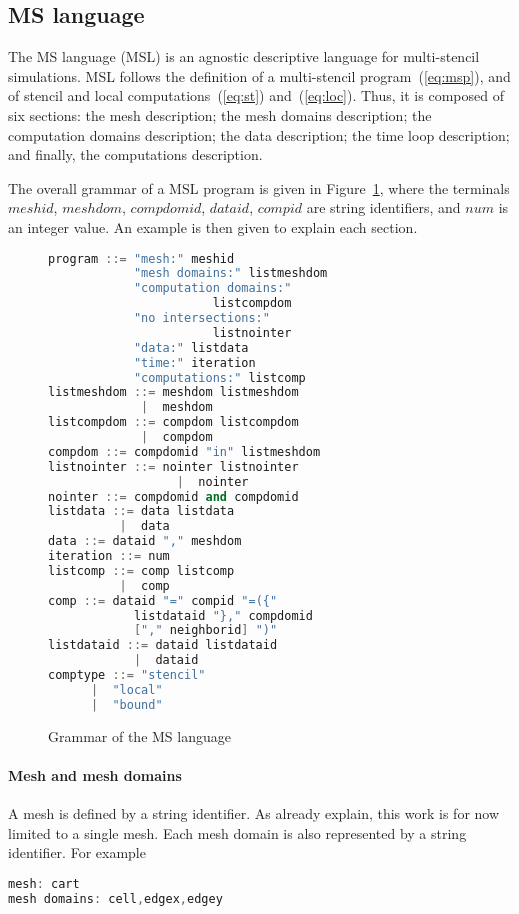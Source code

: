 \subsection{MS language}
The MS language (MSL) is an agnostic descriptive language for multi-stencil simulations. MSL follows the definition of a multi-stencil program~(\ref{eq:msp}), and of stencil and local computations~(\ref{eq:st}) and~(\ref{eq:loc}). Thus, it is composed of six sections: the mesh description; the mesh domains description; the computation domains description; the data description; the time loop description; and finally, the computations description.

The overall grammar of a MSL program is given in Figure~\ref{fig:grammar}, where the terminals $meshid$, $meshdom$, $compdomid$, $dataid$, $compid$ are string identifiers, and $num$ is an integer value. An example is then given to explain each section.

\begin{figure}[h!]
\begin{lstlisting}[basicstyle=\small,mathescape,frame=single,language=C++]
program ::= "mesh:" meshid 
            "mesh domains:" listmeshdom
            "computation domains:" 
                       listcompdom
            "no intersections:"
                       listnointer
            "data:" listdata
            "time:" iteration
            "computations:" listcomp
listmeshdom ::= meshdom listmeshdom
             |  meshdom
listcompdom ::= compdom listcompdom
             |  compdom
compdom ::= compdomid "in" listmeshdom
listnointer ::= nointer listnointer
                  |  nointer
nointer ::= compdomid and compdomid
listdata ::= data listdata
          |  data
data ::= dataid "," meshdom
iteration ::= num
listcomp ::= comp listcomp
          |  comp
comp ::= dataid "=" compid "=({" 
            listdataid "}," compdomid 
            ["," neighborid] ")"
listdataid ::= dataid listdataid
            |  dataid
comptype ::= "stencil"
      |  "local"
      |  "bound"
\end{lstlisting}
\caption{Grammar of the MS language}
\label{fig:grammar}
\end{figure}

\paragraph{Mesh and mesh domains} A mesh is defined by a string identifier. As already explain, this work is for now limited to a single mesh. Each mesh domain is also represented by a string identifier. For example
\begin{lstlisting}[basicstyle=\small,mathescape,frame=single,language=C++]
mesh: cart
mesh domains: cell,edgex,edgey
\end{lstlisting}

